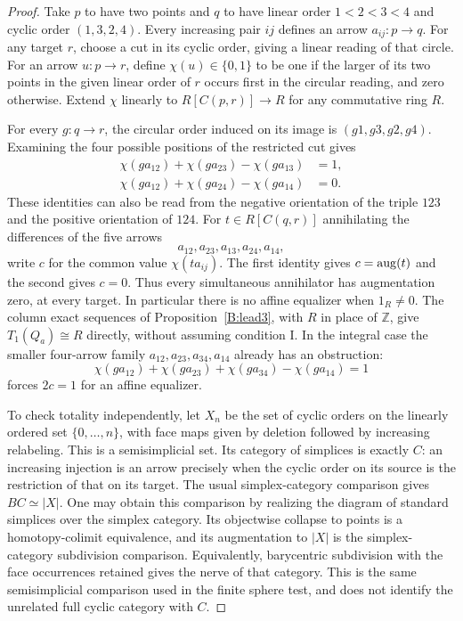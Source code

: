 \begin{proof}
Take $p$ to have two points and $q$ to have linear order
$1<2<3<4$ and cyclic order $(1,3,2,4)$. Every increasing pair
$ij$ defines an arrow $a_{ij}:p\to q$. For any target $r$, choose
a cut in its cyclic order, giving a linear reading of that circle.
For an arrow $u:p\to r$, define $\chi(u)\in\{0,1\}$ to be one
if the larger of its two points in the given linear order of $r$
occurs first in the circular reading, and zero otherwise. Extend
$\chi$ linearly to $R[C(p,r)]\to R$ for any commutative ring $R$.

For every $g:q\to r$, the circular order induced on its image is
$(g1,g3,g2,g4)$. Examining the four possible positions of the
restricted cut gives
\[
\begin{split}
 \chi(ga_{12})+\chi(ga_{23})-\chi(ga_{13})&=1,\\
 \chi(ga_{12})+\chi(ga_{24})-\chi(ga_{14})&=0.
\end{split}
\]
These identities can also be read from the negative orientation
of the triple $123$ and the positive orientation of $124$.
For $t\in R[C(q,r)]$ annihilating the differences of the five
arrows
\[
 a_{12},a_{23},a_{13},a_{24},a_{14},
\]
write $c$ for the common value $\chi(ta_{ij})$. The first identity
gives $c=\operatorname{aug}(t)$ and the second gives $c=0$. Thus every simultaneous
annihilator has augmentation zero, at every target. In particular
there is no affine equalizer when $1_R\ne0$. The column exact
sequences of Proposition~\ref{B:lead3}, with $R$ in place of
$\mathbb Z$, give $T_1(Q_a)\cong R$ directly, without assuming
condition I. In the integral case the smaller four-arrow family
$a_{12},a_{23},a_{34},a_{14}$ already has an obstruction:
\[
 \chi(ga_{12})+\chi(ga_{23})+\chi(ga_{34})-\chi(ga_{14})=1
\]
forces $2c=1$ for an affine equalizer.

To check totality independently, let $X_n$ be the set of cyclic
orders on the linearly ordered set $\{0,\ldots,n\}$, with face maps
given by deletion followed by increasing relabeling. This is a
semisimplicial set. Its category of simplices is exactly $C$:
an increasing injection is an arrow precisely when the cyclic
order on its source is the restriction of that on its target.
The usual simplex-category comparison gives
$BC\simeq |X|$. One may obtain this comparison by realizing the
diagram of standard simplices over the simplex category. Its
objectwise collapse to points is a homotopy-colimit equivalence,
and its augmentation to $|X|$ is the simplex-category subdivision
comparison. Equivalently, barycentric subdivision with the face
occurrences retained gives the nerve of that category. This is
the same semisimplicial comparison used in the finite sphere
test, and does not identify the unrelated full cyclic category
with $C$.


\end{proof}
